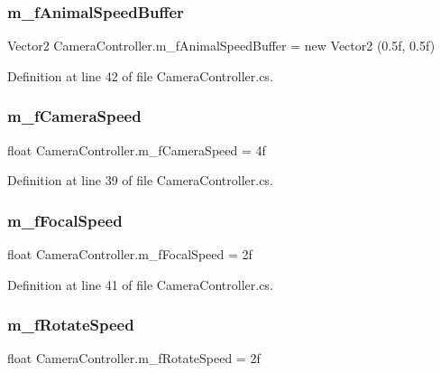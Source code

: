 \subsubsection{\texorpdfstring{m\+\_\+f\+Animal\+Speed\+Buffer}{m\_fAnimalSpeedBuffer}}
{\footnotesize\ttfamily Vector2 Camera\+Controller.\+m\+\_\+f\+Animal\+Speed\+Buffer = new Vector2 (0.\+5f, 0.\+5f)}



Definition at line 42 of file Camera\+Controller.\+cs.

\mbox{\label{class_camera_controller_a8798ad2d23175bf6a1fc55905ee8e22a}} 
\subsubsection{\texorpdfstring{m\+\_\+f\+Camera\+Speed}{m\_fCameraSpeed}}
{\footnotesize\ttfamily float Camera\+Controller.\+m\+\_\+f\+Camera\+Speed = 4f}



Definition at line 39 of file Camera\+Controller.\+cs.

\mbox{\label{class_camera_controller_ac00593a666b5192bcd109a0eebf7a272}} 
\subsubsection{\texorpdfstring{m\+\_\+f\+Focal\+Speed}{m\_fFocalSpeed}}
{\footnotesize\ttfamily float Camera\+Controller.\+m\+\_\+f\+Focal\+Speed = 2f}



Definition at line 41 of file Camera\+Controller.\+cs.

\mbox{\label{class_camera_controller_a2353caba06439ca6ec202ea74d5a607d}} 
\subsubsection{\texorpdfstring{m\+\_\+f\+Rotate\+Speed}{m\_fRotateSpeed}}
{\footnotesize\ttfamily float Camera\+Controller.\+m\+\_\+f\+Rotate\+Speed = 2f}



